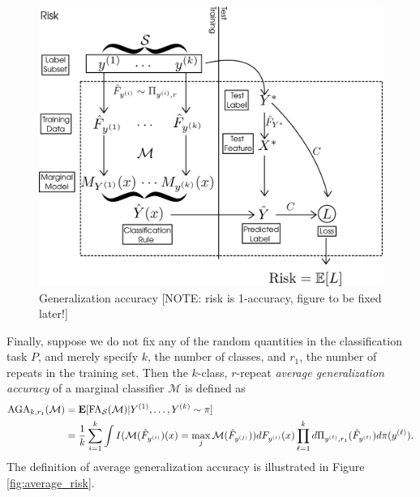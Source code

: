 \begin{figure}[h]
\centering
\includegraphics[scale = 0.3]{../extrapolation_figures/risk.png}
\caption{Generalization accuracy [NOTE: risk is 1-accuracy, figure to be fixed later!]}\label{fig:risk}
\end{figure}

Finally, suppose we do not fix any of the random quantities in the
classification task $P$, and merely specify $k$, the number of
classes, and $r_1$, the number of repeats in the training set.  
Then the $k$-class, $r$-repeat \emph{average generalization accuracy} of
a marginal classifier $\mathcal{M}$ is defined as
\begin{align*}
\text{AGA}_{k,r_1}(\mathcal{M}) &= \textbf{E}[\text{FA}_{\mathcal{S}}(\mathcal{M})|Y^{(1)}, \hdots, Y^{(k)} \sim \pi]
\\&= \frac{1}{k} \sum_{i=1}^k \int
I(\mathcal{M}(\hat{F}_{y^{(i)}})(x) = \max_j
\mathcal{M}(\hat{F}_{y^{(j)}})) dF_{y^{(i)}}(x) \prod_{\ell=1}^k
d\Pi_{y^{(\ell)}, r_1}(\hat{F}_{y^{(\ell)}}) d\pi(y^{(\ell)}).
\end{align*}
The definition of average generalization accuracy is illustrated in Figure \ref{fig:average_risk}.


